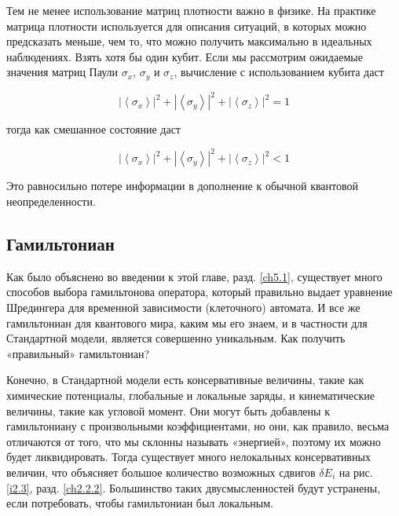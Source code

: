 \documentclass[main.tex]{subfiles}
\begin{document}
Тем не менее использование матриц плотности важно в физике. На практике матрица плотности используется для описания ситуаций, в которых можно предсказать меньше, чем то, что можно получить максимально в идеальных наблюдениях. Взять хотя бы один кубит. Если мы рассмотрим ожидаемые значения матриц Паули $\sigma_x$, $\sigma_y$ и $\sigma_z$, вычисление с использованием кубита даст


\begin{equation}\label{5.19}
	\left|\left\langle\sigma_{x}\right\rangle\right|^{2}+\left|\left\langle\sigma_{y}\right\rangle\right|^{2}+\left|\left\langle\sigma_{z}\right\rangle\right|^{2}=1
\end{equation}
            
тогда как смешанное состояние даст

\begin{equation}\label{5.20}
	\left|\left\langle\sigma_{x}\right\rangle\right|^{2}+\left|\left\langle\sigma_{y}\right\rangle\right|^{2}+\left|\left\langle\sigma_{z}\right\rangle\right|^{2} < 1
\end{equation}

Это равносильно потере информации в дополнение к обычной квантовой неопределенности.

\subsection{Гамильтониан}\label{ch5.6}
            
Как было объяснено во введении к этой главе, разд. \ref{ch5.1}, существует много способов выбора гамильтонова оператора, который правильно выдает уравнение Шредингера для временной зависимости (клеточного) автомата. И все же гамильтониан для квантового мира, каким мы его знаем, и в частности для Стандартной модели, является совершенно уникальным. Как получить «правильный» гамильтониан?

Конечно, в Стандартной модели есть консервативные величины, такие как химические потенциалы, глобальные и локальные заряды, и кинематические величины, такие как угловой момент. Они могут быть добавлены к гамильтониану с произвольными коэффициентами, но они, как правило, весьма отличаются от того, что мы склонны называть «энергией», поэтому их можно будет ликвидировать. Тогда существует много нелокальных консервативных величин, что объясняет большое количество возможных сдвигов $\delta E_i$ на рис. \ref{i2.3}, разд. \ref{ch2.2.2}. Большинство таких двусмысленностей будут устранены, если потребовать, чтобы гамильтониан был локальным.
\end{document}
